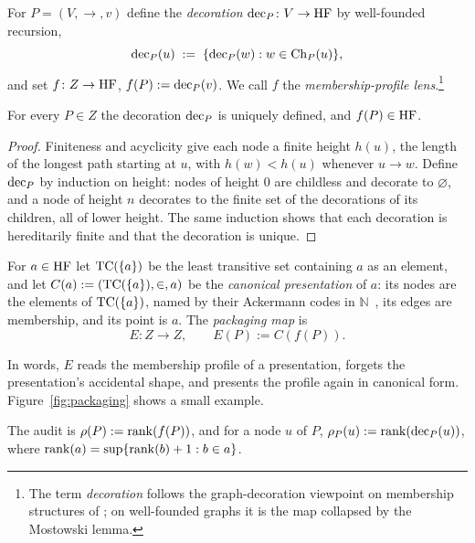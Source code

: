 \begin{definition}\label{def:lens}
For $P=(V,\to,v)$ define the \emph{decoration} $\operatorname{dec}_P\colon V\to\mathrm{HF}$ by well-founded
recursion,
\[
  \operatorname{dec}_P(u)\;:=\;\{\operatorname{dec}_P(w): w\in\operatorname{Ch}_P(u)\},
\]
and set $f\colon Z\to\mathrm{HF}$, $f(P):=\operatorname{dec}_P(v)$. We call $f$ the \emph{membership-profile
lens}.\footnote{The term \emph{decoration} follows the graph-decoration viewpoint on membership
structures of \citet{Aczel1988}; on well-founded graphs it is the map collapsed by the Mostowski
lemma.}
\end{definition}

\begin{lemma}\label{lem:L1}
For every $P\in Z$ the decoration $\operatorname{dec}_P$ is uniquely defined, and $f(P)\in\mathrm{HF}$.
\end{lemma}

\begin{proof}
Finiteness and acyclicity give each node a finite height $h(u)$, the length of the longest
path starting at $u$, with $h(w)<h(u)$ whenever $u\to w$. Define $\operatorname{dec}_P$ by induction on
height: nodes of height $0$ are childless and decorate to $\varnothing$, and a node of height $n$
decorates to the finite set of the decorations of its children, all of lower height. The same
induction shows that each decoration is hereditarily finite and that the decoration is unique.
\end{proof}

\begin{definition}\label{def:E}
For $a\in\mathrm{HF}$ let $\operatorname{TC}(\{a\})$ be the least transitive set containing $a$ as an element, and let
$C(a):=(\operatorname{TC}(\{a\}),\in,a)$ be the \emph{canonical presentation} of $a$: its nodes are the
elements of $\operatorname{TC}(\{a\})$, named by their Ackermann codes in $\mathbb N$~\citep{Ackermann1937},
its edges are membership, and its point is $a$. The \emph{packaging map} is
\[
  E\colon Z\to Z,\qquad E(P):=C(f(P)).
\]
\end{definition}

In words, $E$ reads the membership profile of a presentation, forgets the presentation's
accidental shape, and presents the profile again in canonical form. Figure~\ref{fig:packaging}
shows a small example.



\begin{definition}\label{def:rank}
The audit is $\rho(P):=\operatorname{rank}(f(P))$, and for a node $u$ of $P$, $\rho_P(u):=\operatorname{rank}(\operatorname{dec}_P(u))$,
where $\operatorname{rank}(a)=\sup\{\operatorname{rank}(b)+1: b\in a\}$.
\end{definition}


